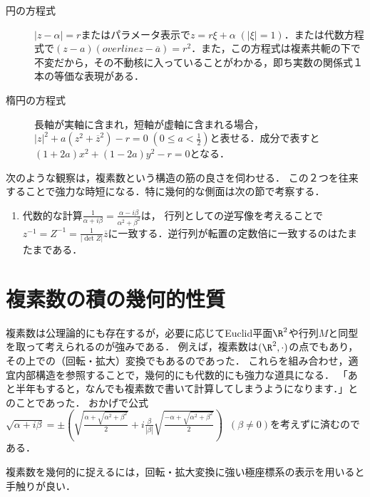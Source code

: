 \documentclass[uplatex, dvipdfmx]{jsreport}
\begin{document}
\begin{example}[代数方程式]\mbox{}
    \begin{description}
        \item[円の方程式] $|z-\alpha|=r$またはパラメータ表示で$z=r\xi+\alpha\;(|\xi|=1)$．または代数方程式で$(z-a)(overline{z}-\overline{a})=r^2$．また，この方程式は複素共軛の下で不変だから，その不動核に入っていることがわかる，即ち実数の関係式１本の等価な表現がある． 
        \item[楕円の方程式] 長軸が実軸に含まれ，短軸が虚軸に含まれる場合，$|z|^2+a(z^2+\overline{z}^2)-r=0\;(0\le a<\frac{1}{2})$と表せる．成分で表すと$(1+2a)x^2+(1-2a)y^2-r=0$となる． 
    \end{description}
\end{example}

\begin{remark}[２つの構成の緊密な協調]次のような観察は，複素数という構造の筋の良さを伺わせる．
    この２つを往来することで強力な時短になる．特に幾何的な側面は次の節で考察する．
    \begin{enumerate}
        \item 代数的な計算$\frac{1}{\alpha+i\beta}=\frac{\alpha-i\beta}{\alpha^2+\beta^2}$は，
        行列としての逆写像を考えることで$z^{-1}=Z^{-1}=\frac{1}{|\det Z|}\overline{z}$に一致する．逆行列が転置の定数倍に一致するのはたまたまである．
    \end{enumerate}
\end{remark}

\section{複素数の積の幾何的性質}

\begin{screen}
    複素数は公理論的にも存在するが，必要に応じてEuclid平面$\R^2$や行列$M$と同型を取って考えられるのが強みである．
    例えば，複素数は$(\R^2,\cdot)$の点でもあり，その上での（回転・拡大）変換でもあるのであった．
    これらを組み合わせ，適宜内部構造を参照することで，幾何的にも代数的にも強力な道具になる．
    「あと半年もすると，なんでも複素数で書いて計算してしまうようになります．」とのことであった．
    おかげで公式$\sqrt{\alpha+i\beta}=\pm\left(\sqrt{\frac{\alpha+\sqrt{\alpha^2+\beta^2}}{2}}+i\frac{\beta}{|\beta|}\sqrt{\frac{-\alpha+\sqrt{\alpha^2+\beta^2}}{2}}\right)\;\;(\beta\ne 0)$を考えずに済むのである．
\end{screen}

複素数を幾何的に捉えるには，回転・拡大変換に強い極座標系の表示を用いると手触りが良い．
\end{document}
